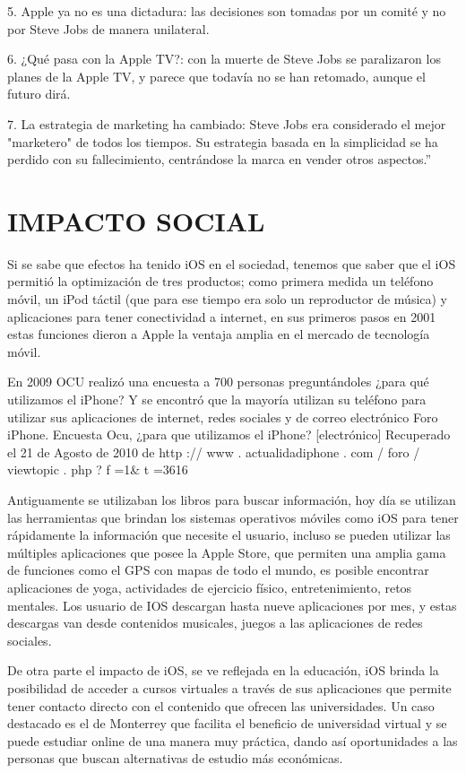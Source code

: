 5. Apple ya no es una dictadura: las decisiones son tomadas
por un comité y no por Steve Jobs de manera unilateral.

6. ¿Qué pasa con la Apple TV?: con la muerte de Steve Jobs se
paralizaron los planes de la Apple TV, y parece que todavía no se
han retomado, aunque el futuro dirá.

7. La estrategia de marketing ha cambiado: Steve Jobs era
considerado el mejor "marketero" de todos los tiempos. Su
estrategia basada en la simplicidad se ha perdido con su
fallecimiento, centrándose la marca en vender otros aspectos.”

\section*{IMPACTO SOCIAL}

Si se sabe que efectos ha tenido iOS en el sociedad, tenemos
que saber que el iOS permitió la optimización de tres productos;
como primera medida un teléfono móvil, un iPod táctil (que para
ese tiempo era solo un reproductor de música) y aplicaciones
para tener conectividad a internet, en sus primeros pasos en
2001 estas funciones dieron a Apple la ventaja amplia en el
mercado de tecnología móvil.

En 2009 OCU realizó una encuesta a 700 personas
preguntándoles ¿para qué utilizamos el iPhone? Y se encontró
que la mayoría utilizan su teléfono para utilizar sus aplicaciones
de internet, redes sociales y de correo electrónico
Foro iPhone. Encuesta Ocu, ¿para que utilizamos el
iPhone? [electrónico] Recuperado el 21 de Agosto de 2010
de http :// www . actualidadiphone . com / foro / viewtopic . php ?
f =1\& t =3616

Antiguamente se utilizaban los libros para buscar información,
hoy día se utilizan las herramientas que brindan los sistemas
operativos móviles como iOS para tener rápidamente la
información que necesite el usuario, incluso se pueden utilizar
las múltiples aplicaciones que posee la Apple Store, que
permiten una amplia gama de funciones como el GPS con mapas
de todo el mundo, es posible encontrar aplicaciones de yoga,
actividades de ejercicio físico, entretenimiento, retos mentales.
Los usuario de IOS descargan hasta nueve aplicaciones por mes,
y estas descargas van desde contenidos musicales, juegos a las
aplicaciones de redes sociales.

De otra parte el impacto de iOS, se ve reflejada en la educación,
iOS brinda la posibilidad de acceder a cursos virtuales a través
de sus aplicaciones que permite tener contacto directo con el
contenido que ofrecen las universidades. Un caso destacado es
el de Monterrey que facilita el beneficio de universidad virtual y
se puede estudiar online de una manera muy práctica, dando así
oportunidades a las personas que buscan alternativas de estudio
más económicas.

